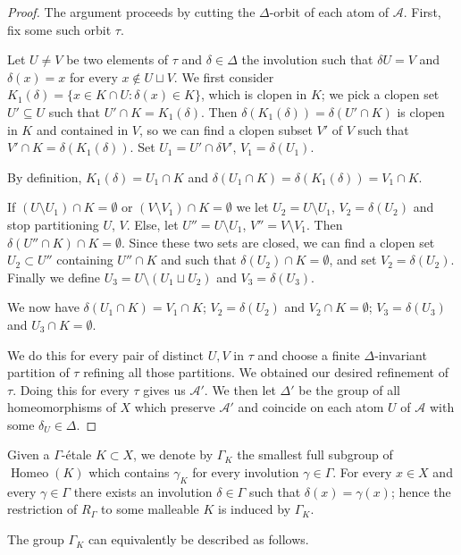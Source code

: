 \documentclass[10pt,a4paper]{article}
\theoremstyle{definition}
\DeclareMathOperator{\Homeo}{Homeo}
\newcommand{\mcA}{\mathcal{A}}
\begin{document}
\begin{proof}
The argument proceeds by cutting the $\Delta$-orbit of each atom of $\mcA$. First, fix some such orbit $\tau$.

Let $U \ne V$ be two elements of $\tau$ and $\delta \in \Delta$ the involution such that $\delta U=V$ and $\delta(x)=x$ for every $x \not \in U \sqcup V$. We first consider $K_1(\delta) = \{x \in K \cap U : \delta(x) \in K\}$, which is clopen in $K$; we pick a clopen set $U' \subseteq U$ such that $U' \cap K=K_1(\delta)$. Then $\delta(K_1(\delta))=\delta(U' \cap K)$ is clopen in $K$ and contained in $V$, so we can find a clopen subset $V'$ of $V$ such that $V' \cap K= \delta(K_1(\delta))$. Set $U_1 = U' \cap \delta V'$, $V_1= \delta (U_1)$.

By definition, $K_1(\delta)= U_1 \cap K$ and $\delta(U_1 \cap K)= \delta(K_1(\delta))=V_1 \cap K$.

If $(U \setminus U_1) \cap K= \emptyset$ or $(V \setminus V_1) \cap K= \emptyset$ we let $U_2=U \setminus U_1$, $V_2=\delta(U_2)$ and stop partitioning $U$, $V$. Else, let $U''=U \setminus U_1$, $V''=V \setminus V_1$. Then $\delta(U'' \cap K) \cap K=\emptyset$. Since these two sets are closed, we can find a clopen set $U_2 \subset U''$ containing $U'' \cap K$ and such that $\delta(U_2) \cap K= \emptyset$, and set $V_2= \delta(U_2)$. Finally we define $U_3= U \setminus (U_1 \sqcup U_2)$ and $V_3=\delta(U_3)$.

We now have $\delta(U_1 \cap K)= V_1 \cap K$; $V_2=\delta(U_2)$ and $V_2 \cap K=\emptyset$; $V_3=\delta(U_3)$ and $U_3 \cap K=\emptyset$.

We do this for every pair of distinct $U,V$ in $\tau$ and choose a finite $\Delta$-invariant partition of $\tau$ refining all those partitions. We obtained our desired refinement of $\tau$. Doing this for every $\tau$ gives us $\mcA'$. We then let $\Delta'$ be the group of all homeomorphisms of $X$ which preserve $\mcA'$ and coincide on each atom $U$ of $\mcA$ with some $\delta_U \in \Delta$.
\end{proof}


Given a $\Gamma$-étale $K \subset X$, we denote by $\Gamma_K$ the smallest full subgroup of $\Homeo(K)$ which contains $\gamma_K$ for every involution $\gamma \in \Gamma$. For every $x \in X$ and every $\gamma \in \Gamma$ there exists an involution $\delta \in \Gamma$ such that $\delta(x)=\gamma(x)$; hence the restriction of $R_\Gamma$ to some malleable $K$ is induced by $\Gamma_K$.

The group $\Gamma_K$ can equivalently be described as follows.
\end{document}

